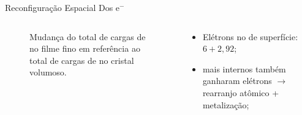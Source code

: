 \begin{frame}{Reconfiguração Espacial Dos e$^-$}
	\begin{columns}
		\begin{column}{.6\textwidth}
			\begin{figure}[t]
				\centering
				
				\caption{Mudança do total de cargas de  no filme fino em referência ao total de cargas de  no cristal volumoso.\label{fig:bader_chg_comparison}}
			\end{figure}
		\end{column}
		\begin{column}{.4\textwidth}
			\begin{itemize}
				\item Elétrons no  de superfície: $6 + 2,\!92$;
				\item {} mais internos também ganharam elétrons $\to$ \alert{rearranjo atômico + metalização};
			\end{itemize}
		\end{column}
	\end{columns}
\end{frame}
